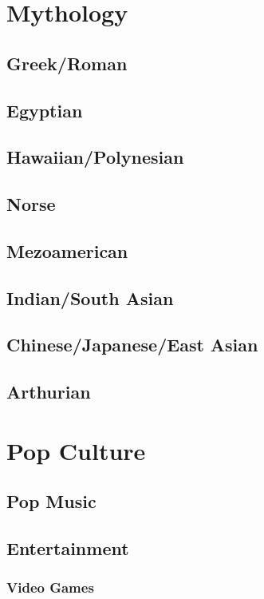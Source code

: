 \documentclass[12pt]{book}
\begin{document}
\chapter{Mythology}
	\section{Greek/Roman}
	\section{Egyptian}
	\section{Hawaiian/Polynesian}
	\section{Norse}
	\section{Mezoamerican}
	\section{Indian/South Asian}
	\section{Chinese/Japanese/East Asian}
	\section{Arthurian}



	

	

		
	
\chapter{Pop Culture}
	\section{Pop Music}
	\section{Entertainment}
		\subsection{Video Games}
\end{document}
